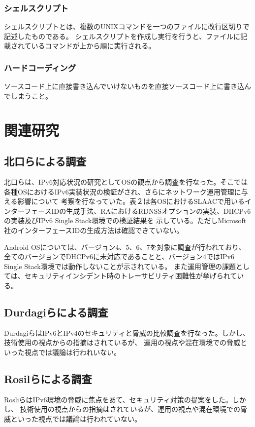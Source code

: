 \documentclass[a4j]{jarticle}
\begin{document}
\subsubsection{シェルスクリプト}
シェルスクリプトとは、複数のUNIXコマンドを一つのファイルに改行区切りで記述したものである。
シェルスクリプトを作成し実行を行うと、ファイルに記載されているコマンドが上から順に実行される。

\subsubsection{ハードコーディング}
ソースコード上に直接書き込んでいけないものを直接ソースコード上に書き込んでしまうこと。
\newpage
\section{関連研究} %
\subsection{北口らによる調査}
北口らは、IPv6対応状況の研究としてOSの観点から調査を行なった。そこでは各種OSにおけるIPv6実装状況の検証がされ、さらにネットワーク運用管理に与える影響について
考察を行なっていた。表２は各OSにおけるSLAACで用いるインターフェースIDの生成手法、RAにおけるRDNSSオプションの実装、DHCPv6の実装及びIPv6 Single Stack環境での検証結果を
示している。ただしMicrosoft社のインターフェースIDの生成方法は確認できていない。

Android OSについては、バージョン4、5、6、7を対象に調査が行われており、全てのバージョンでDHCPv6に未対応であることと、バージョン4ではIPv6 Single Stack環境では動作しないことが示されている。
また運用管理の課題としては、セキュリティインシデント時のトレーサビリティ困難性が挙げられている\cite{three}。
\subsection{Durdagiらによる調査}
DurdagiらはIPv6とIPv4のセキュリティと脅威の比較調査を行なった。しかし、技術使用の視点からの指摘はされているが、
運用の視点や混在環境での脅威といった視点では議論は行われいない\cite{five}。

\subsection{Rosilらによる調査}
RosliらはIPv6環境の脅威に焦点をあて、セキュリティ対策の提案をした。しかし、
技術使用の視点からの指摘はされているが、運用の視点や混在環境での脅威といった視点では議論は行われていない\cite{six}。
\end{document}
